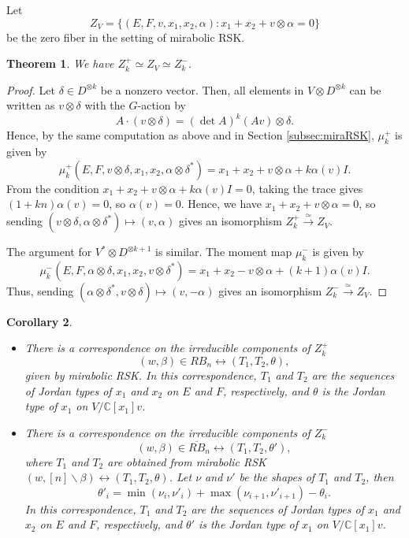 \documentclass[12pt,a4paper]{article}
\theoremstyle{plain}
\newtheorem{thm}{Theorem}[section]
\newtheorem{cor}[thm]{Corollary}
\theoremstyle{definition}
\theoremstyle{remark}
\newcommand{\CC}{\mathbb{C}}
\begin{document}
    Let
    \[
    Z_V = \{(E,F,v,x_1,x_2,\alpha):x_1+x_2+v\otimes\alpha = 0\}
    \]
    be the zero fiber in the setting of mirabolic RSK.

    \begin{thm}\label{thm:Z+-}
        We have $Z^+_k \simeq Z_V \simeq Z^-_k$.
    \end{thm}

    \begin{proof}
        Let $\delta \in D^{\otimes k}$ be a nonzero vector. Then, all elements in $V\otimes D^{\otimes k}$ can be written as $v\otimes \delta$ with the $G$-action by
        \[
        A\cdot (v\otimes \delta) = (\det A)^k (Av)\otimes \delta.
        \]
        Hence, by the same computation as above and in Section \ref{subsec:miraRSK}, $\mu^+_k$ is given by
        \[
        \mu^+_k(E,F,v\otimes \delta,x_1,x_2,\alpha\otimes \delta^*) = x_1 + x_2 + v\otimes\alpha + k\alpha(v) I.
        \]
        From the condition $ x_1 + x_2 + v\otimes\alpha + k\alpha(v) I = 0$, taking the trace gives $(1+kn)\alpha(v) = 0$, so $\alpha(v) = 0$. Hence, we have $x_1 + x_2 + v\otimes \alpha = 0$, so sending $(v\otimes \delta,\alpha\otimes \delta^*) \mapsto (v,\alpha)$ gives an isomorphism $Z^+_k \xrightarrow{\simeq} Z_V$.

        The argument for $V^*\otimes D^{\otimes k+1}$ is similar. The moment map $\mu^-_k$ is given by
        \[
        \mu^-_k(E,F,\alpha\otimes \delta,x_1,x_2,v\otimes \delta^*) = x_1 + x_2 - v\otimes\alpha + (k+1)\alpha(v) I.
        \]
        Thus, sending $(\alpha\otimes \delta^*,v\otimes \delta) \mapsto (v,-\alpha)$ gives an isomorphism $Z^-_k \xrightarrow{\simeq} Z_V$.
    \end{proof}

    \begin{cor}\label{cor:Z+-}
        \begin{itemize}
            \item There is a correspondence on the irreducible components of $Z^+_k$
            \[
            (w,\beta)\in RB_n \longleftrightarrow (T_1,T_2,\theta),
            \]
            given by mirabolic RSK. In this correspondence, $T_1$ and $T_2$ are the sequences of Jordan types of $x_1$ and $x_2$ on $E$ and $F$, respectively, and $\theta$ is the Jordan type of $x_1$ on $V/\CC[x_1]v$.
            \item There is a correspondence on the irreducible components of $Z^-_k$
            \[
            (w,\beta) \in \overline{RB}_n \longleftrightarrow (T_1,T_2,\theta'),
            \]
            where $T_1$ and $T_2$ are obtained from mirabolic RSK $(w,[n]\backslash \beta) \longleftrightarrow (T_1,T_2,\theta)$. Let $\nu$ and $\nu'$ be the shapes of $T_1$ and $T_2$, then
            \[
            \theta'_i = \min(\nu_i,\nu'_i) + \max(\nu_{i+1},\nu'_{i+1}) - \theta_i.
            \]
            In this correspondence, $T_1$ and $T_2$ are the sequences of Jordan types of $x_1$ and $x_2$ on $E$ and $F$, respectively, and $\theta'$ is the Jordan type of $x_1$ on $V/\CC[x_1]v$.
        \end{itemize}
    \end{cor}
\end{document}
